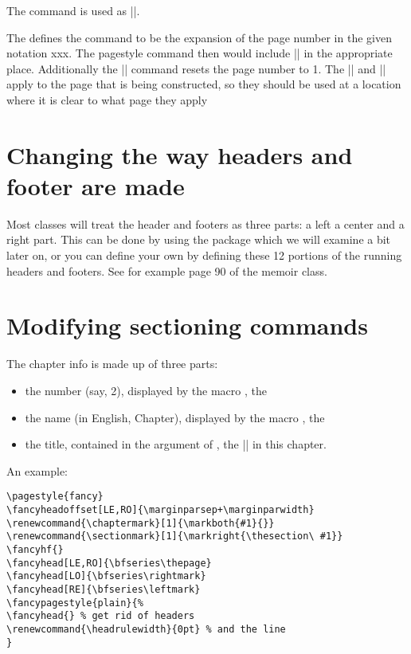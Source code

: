 The command is used as  ||. 

The  defines the command  to be the expansion of the page number
in the given notation xxx. The pagestyle command then would include |\thepage| in the
appropriate place. Additionally the |\pagenumbering| command resets the page number to 1. The
|\pagestyle| and |\pagenumbering| apply to the page that is being constructed, so they should be
used at a location where it is clear to what page they apply

\section{Changing the way headers and footer are made}

Most classes will treat the header and footers as three parts: a left a center and a right part. This can be done by using the package  which we will examine a bit later on, or you can define your own by defining these 12 portions of the running headers and footers. See for example page 90 of the memoir class.



\section{Modifying sectioning commands}
The chapter info  is made up of three parts:

\begin{itemize}
     \item the number (say, 2), displayed by the macro , the {\thechapter} 
     \item the name (in English, Chapter), displayed by the macro , the \chaptername
     \item the title, contained in the argument of , the ||  in this chapter. 
\end{itemize}


\begin{teXXX}
\makeatletter 
  \@chapapp
\makeatother
\end{teXXX}

An example:

\begin{Verbatim}
\pagestyle{fancy}
\fancyheadoffset[LE,RO]{\marginparsep+\marginparwidth}
\renewcommand{\chaptermark}[1]{\markboth{#1}{}}
\renewcommand{\sectionmark}[1]{\markright{\thesection\ #1}}
\fancyhf{}
\fancyhead[LE,RO]{\bfseries\thepage}
\fancyhead[LO]{\bfseries\rightmark}
\fancyhead[RE]{\bfseries\leftmark}
\fancypagestyle{plain}{%
\fancyhead{} % get rid of headers
\renewcommand{\headrulewidth}{0pt} % and the line
}
\end{Verbatim}



